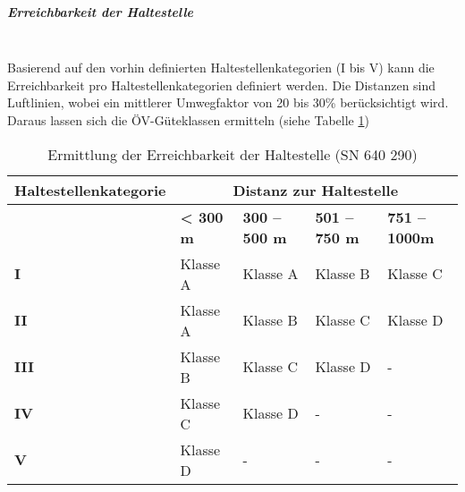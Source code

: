 \subparagraph{Erreichbarkeit der Haltestelle}~\\
\label{Definition ÖV-Güteklassen:Erreichbarkeit der Haltestelle}
Basierend auf den vorhin definierten Haltestellenkategorien (I bis V) kann die Erreichbarkeit pro Haltestellenkategorien definiert werden.
Die Distanzen sind Luftlinien, wobei ein mittlerer Umwegfaktor von 20 bis 30\% berücksichtigt wird.
Daraus lassen sich die \acs{ÖV}-Güteklassen ermitteln (siehe Tabelle \ref{table:Ermittlung Erreichbarkeit der Haltestelle (SN 640 290)})

\begin{table}[ht]
    \begin{tabular}[c]{l p{2.5cm} p{2.5cm} p{2.5cm} p{2.5cm}}
        \toprule
        \textbf{Haltestellenkategorie}
                                & \multicolumn{4}{c}{\textbf{Distanz zur Haltestelle}}\\
        \midrule
        \textbf{}
                                & \textbf{< 300 m}
                                & \textbf{300 -- 500 m}
                                & \textbf{501 -- 750 m}
                                & \textbf{751 -- 1000m}\\
        \textbf{I}
                                & Klasse A
                                & Klasse A
                                & Klasse B
                                & Klasse C\\
        \textbf{II}
                                & Klasse A
                                & Klasse B
                                & Klasse C
                                & Klasse D\\
        \textbf{III}
                                & Klasse B
                                & Klasse C
                                & Klasse D
                                & -\\
        \textbf{IV}
                                & Klasse C
                                & Klasse D
                                & -
                                & -\\
        \textbf{V}
                                & Klasse D
                                & -
                                & -
                                & -\\
        \bottomrule
    \end{tabular}
    \caption{Ermittlung der Erreichbarkeit der Haltestelle (SN 640 290)}
    \label{table:Ermittlung Erreichbarkeit der Haltestelle (SN 640 290)}
\end{table}

